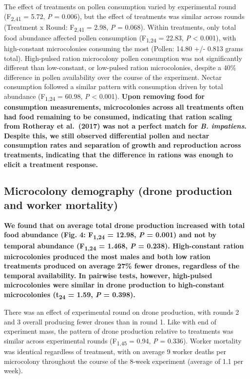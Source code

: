 \documentclass[11pt,]{article}
\begin{document}
The effect of treatments on pollen consumption varied by experimental
round (F\textsubscript{2,41} = 5.72, \emph{P} = 0.006), but the effect
of treatments was similar across rounds (Treatment x Round:
F\textsubscript{2,41} = 2.98, \emph{P} = 0.068). Within treatments, only
total food abundance affected pollen consumption (F\textsubscript{1,24}
= 22.83, \emph{P} \textless{} 0.001), with high-constant microcolonies
consuming the most (Pollen: 14.80 +/- 0.813 grams total). High-pulsed
ration microcolony pollen consumption was not significantly different
than low-constant, or low-pulsed ration microcolonies, despite a 40\%
difference in pollen availability over the course of the experiment.
Nectar consumption followed a similar pattern with consumption driven by
total abundance (F\textsubscript{1,24} = 60.98, \emph{P} \textless{}
0.001). \textbf{Upon removing food for consumption measurements,
microcolonies across all treatments often had food remaining to be
consumed, indicating that ration scaling from Rotheray et al.~(2017) was
not a perfect match for \emph{B. impatiens}. Despite this, we still
observed differential pollen and nectar consumption rates and separation
of growth and reproduction across treatments, indicating that the
difference in rations was enough to elicit a treatment response.}

\hypertarget{microcolony-demography-drone-production-and-worker-mortality}{%
\subsection{Microcolony demography (drone production and worker
mortality)}\label{microcolony-demography-drone-production-and-worker-mortality}}

\textbf{We found that on average total drone production increased with
total food abundance (Fig. 4: F\textsubscript{1,24} = 12.98, \emph{P} =
0.001) and not by temporal abundance (F\textsubscript{1,24} = 1.468,
\emph{P} = 0.238). High-constant ration microcolonies produced the most
males and both low ration treatments produced on average 27\% fewer
drones, regardless of the temporal availability. In pairwise tests,
however, high-pulsed microcolonies were similar in drone production to
high-constant microcolonies (t\textsubscript{24} = 1.59, \emph{P} =
0.398).}

There was an effect of experimental round on drone production, with
rounds 2 and 3 overall producing fewer drones than in round 1. Like with
end of experiment mass, the pattern of drone production relative to
treatments was similar across experimental rounds (F\textsubscript{1,45}
= 0.94, \emph{P} = 0.336). Worker mortality was identical regardless of
treatment, with on average 9 worker deaths per microcolony throughout
the course of the 8-week experiment (average of 1.1 per week).
\end{document}
